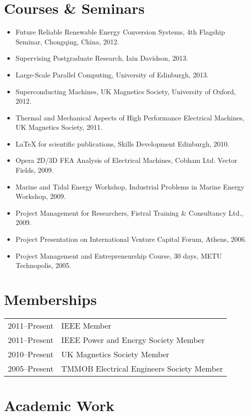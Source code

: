 \documentclass[a4paper,12pt]{article}
\begin{document}
\section{Courses \& Seminars}
\begin{itemize}
\item Future Reliable Renewable Energy Conversion Systems, 4th Flagship Seminar, Chongqing, China, 2012.
\item Supervising Postgraduate Research, Iain Davidson, 2013. 
\item Large-Scale Parallel Computing, University of Edinburgh, 2013.
\item Superconducting Machines, UK Magnetics Society, University of Oxford, 2012.
\item Thermal and Mechanical Aspects of High Performance Electrical Machines, UK Magnetics Society, 2011.
\item LaTeX for scientific publications, Skills Development Edinburgh, 2010.
\item Opera 2D/3D FEA Analysis of Electrical Machines, Cobham Ltd. Vector Fields, 2009.
\item Marine and Tidal Energy Workshop, Industrial Problems in Marine Energy Workshop, 2009.
\item Project Management for Researchers, Fistral Training \& Consultancy Ltd., 2009.
\item Project Presentation on International Venture Capital Forum, Athens, 2006.
\item Project Management and Entrepreneurship Course, 30 days, METU Technopolis, 2005.
\end{itemize}


\section{Memberships}
\begin{tabular}{ll}
2011--Present & IEEE Member \\
2011--Present & IEEE Power and Energy Society Member \\
2010--Present & UK Magnetics Society Member\\
2005--Present & TMMOB Electrical Engineers Society Member\\
\end{tabular}

\section{Academic Work}
\end{document}
